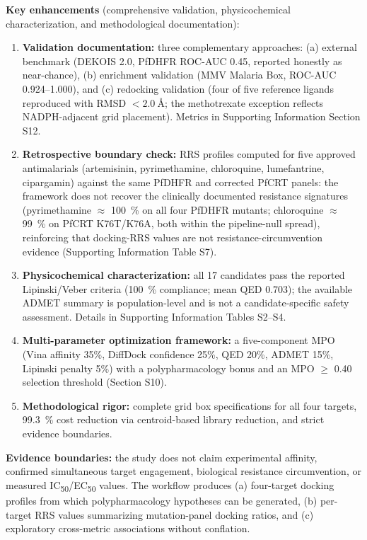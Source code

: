 \documentclass[9pt,letterpaper]{article}
\begin{document}
\noindent\textbf{Key enhancements} (comprehensive validation, physicochemical characterization, and methodological documentation):

\begin{enumerate}
\item \textbf{Validation documentation:} three complementary approaches: (a) external benchmark (DEKOIS 2.0, PfDHFR ROC-AUC \num{0.45}, reported honestly as near-chance), (b) enrichment validation (MMV Malaria Box, ROC-AUC \numrange{0.924}{1.000}), and (c) redocking validation (four of five reference ligands reproduced with RMSD $< \SI{2.0}{\angstrom}$; the methotrexate exception reflects NADPH-adjacent grid placement). Metrics in Supporting Information Section S12.

\item \textbf{Retrospective boundary check:} RRS profiles computed for five approved antimalarials (artemisinin, pyrimethamine, chloroquine, lumefantrine, cipargamin) against the same PfDHFR and corrected PfCRT panels: the framework does not recover the clinically documented resistance signatures (pyrimethamine $\approx$ \qty{100}{\percent} on all four PfDHFR mutants; chloroquine $\approx$ \qty{99}{\percent} on PfCRT K76T/K76A, both within the pipeline-null spread), reinforcing that docking-RRS values are not resistance-circumvention evidence (Supporting Information Table S7).

\item \textbf{Physicochemical characterization:} all 17 candidates pass the reported Lipinski/Veber criteria (\qty{100}{\percent} compliance; mean QED \num{0.703}); the available ADMET summary is population-level and is not a candidate-specific safety assessment. Details in Supporting Information Tables S2--S4.

\item \textbf{Multi-parameter optimization framework:} a five-component MPO (Vina affinity 35\%, DiffDock confidence 25\%, QED 20\%, ADMET 15\%, Lipinski penalty 5\%) with a polypharmacology bonus and an MPO $\geq$ 0.40 selection threshold (Section S10).

\item \textbf{Methodological rigor:} complete grid box specifications for all four targets, \qty{99.3}{\percent} cost reduction via centroid-based library reduction, and strict evidence boundaries.
\end{enumerate}

\noindent\textbf{Evidence boundaries:} the study does not claim experimental affinity, confirmed simultaneous target engagement, biological resistance circumvention, or measured IC\textsubscript{50}/EC\textsubscript{50} values. The workflow produces (a) four-target docking profiles from which polypharmacology hypotheses can be generated, (b) per-target RRS values summarizing mutation-panel docking ratios, and (c) exploratory cross-metric associations without conflation.
\end{document}
